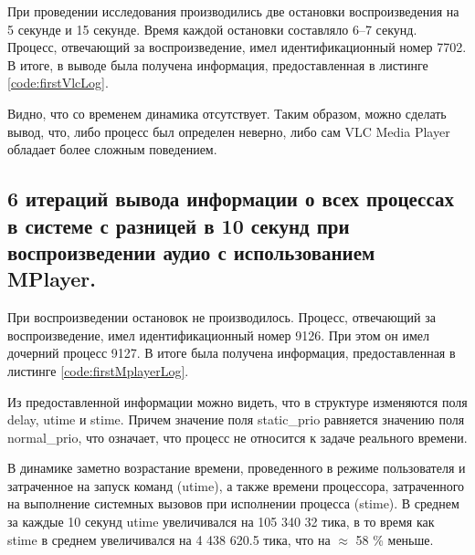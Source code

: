 При проведении исследования производились две остановки воспроизведения на 5 секунде и 15 секунде. Время каждой остановки составляло 6--7 секунд. Процесс, отвечающий за воспроизведение, имел идентификационный номер 7702. В итоге, в выводе была получена информация, предоставленная в листинге \ref{code:firstVlcLog}.


Видно, что со временем динамика отсутствует. Таким образом, можно сделать вывод, что, либо процесс был определен неверно, либо сам VLC Media Player обладает более сложным поведением.

\subsection{6 итераций вывода информации о всех процессах в системе с разницей в 10 секунд при воспроизведении аудио с использованием MPlayer. }
При воспроизведении остановок не производилось. Процесс, отвечающий за воспроизведение, имел идентификационный номер 9126. При этом он имел дочерний процесс 9127. В итоге была получена информация, предоставленная в листинге \ref{code:firstMplayerLog}.


Из предоставленной информации можно видеть, что в структуре изменяются поля delay, utime и stime. Причем значение поля static\_prio равняется значению поля normal\_prio, что означает, что процесс не относится к задаче реального времени.

В динамике заметно возрастание времени, проведенного в режиме пользователя и затраченное на запуск команд (utime), а также времени процессора, затраченного на выполнение системных вызовов при исполнении процесса (stime). В среднем за каждые 10 секунд utime увеличивался на 105 340 32 тика, в то время как stime в среднем увеличивался на 4 438 620.5 тика, что на $\approx$ 58 \% меньше.

